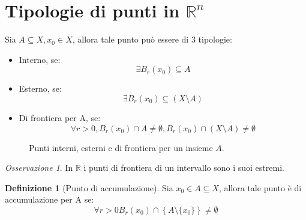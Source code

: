 \documentclass[11pt, a4paper, openright]{book}
\theoremstyle{plain}
\theoremstyle{definition}
\newtheorem{definizione}[teorema]{Definizione}
\theoremstyle{remark}
\newtheorem{osservazione}[teorema]{Osservazione}
\begin{document}
\section{Tipologie di punti in $\mathbb{R}^n$}
Sia $A \subseteq X, x_0 \in X$, allora tale punto può essere di 3 tipologie:
\begin{itemize}
    \item Interno, se:
    \begin{equation}
        \exists B_r(x_0) \subseteq A
    \end{equation}

    \item Esterno, se:
    \begin{equation}
        \exists B_r(x_0) \subseteq (X \setminus A)
    \end{equation}

    \item Di frontiera per A, se:
    \begin{equation}
        \forall r > 0, B_r(x_0) \cap A \neq \emptyset, B_r(x_0) \cap (X \setminus A) \neq \emptyset
    \end{equation}
\end{itemize}

\begin{figure}[H]
    \centering
    \caption{Punti interni, esterni e di frontiera per un insieme $A$.}
\end{figure}

\begin{osservazione}
    In $\mathbb{R}$ i punti di frontiera di un intervallo sono i suoi estremi.
\end{osservazione}

\begin{definizione}[Punto di accumulazione]
    Sia $x_0 \in A \subseteq X$, allora tale punto è di accumulazione per A se:
    \begin{equation}
        \forall r > 0 B_r(x_0) \cap \left\{A \setminus \{x_0\}\right\} \neq \emptyset
    \end{equation}
\end{definizione}
\end{document}
